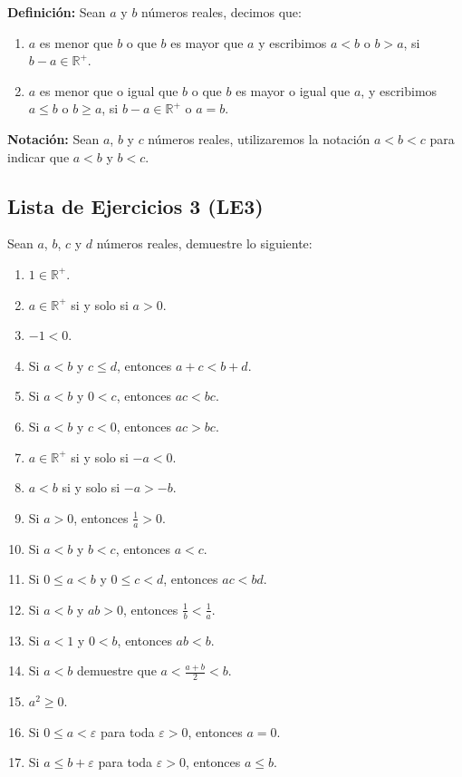 \documentclass[11pt]{article}
\newcommand{\R}{\mathbb{R}}
\begin{document}
\textbf{Definición:} Sean $a$ y $b$ números reales, decimos que:
    \begin{enumerate}
        \item $a$ es menor que $b$ o que $b$ es mayor que $a$ y escribimos $a<b$ o $b>a$, si $b-a \in \mathbb{R}^+$.
    \item $a$ es menor que o igual que $b$ o que $b$ es mayor o igual que $a$, y escribimos $a \leq b$ o $b \geq a$, si $b - a \in \mathbb{R}^+$ o $a = b$.
    \end{enumerate}

\textbf{Notación:} Sean $a$, $b$ y $c$ números reales, utilizaremos la notación $a<b<c$ para indicar que $a<b$ y $b<c$.

\pagebreak

\subsection*{Lista de Ejercicios 3 (LE3)}


Sean $a$, $b$, $c$ y $d$ números reales, demuestre lo siguiente:

\begin{enumerate}[label=\alph*),font=\bfseries]
    \item $1 \in \R^+$.
    \item $a \in \mathbb{R}^+$ si y solo si $a>0$. %
    \item $-1<0$. %
    \item Si $a<b$ y $c \leq d$, entonces $a+c<b+d$. %
    \item Si $a<b$ y $0<c$, entonces $ac<bc$. %
    \item Si $a<b$ y $c<0$, entonces $ac>bc$. %
    \item $a \in \mathbb{R}^+$ si y solo si $-a<0$. %
    \item $a<b$ si y solo si $-a>-b$. %
    \item Si $a>0$, entonces $\frac{1}{a}>0$. %
    \item Si $a<b$ y $b<c$, entonces $a<c$. %
    \item Si $0 \leq a<b$ y $0 \leq c<d$, entonces $ac<bd$. %
    \item Si $a<b$ y $ab>0$, entonces $\frac{1}{b}<\frac{1}{a}$. %
    \item Si $a<1$ y $0<b$, entonces $ab<b$.
    \item Si $a<b$ demuestre que $a<\frac{a+b}{2}<b$.
    \item $a^2\geq 0$.
    \item Si $0 \leq a < \varepsilon$ para toda $\varepsilon > 0$, entonces $a=0$.
    \item Si $a \leq b + \varepsilon$ para toda $\varepsilon > 0$, entonces $a \leq b$.
\end{enumerate}
\end{document}
